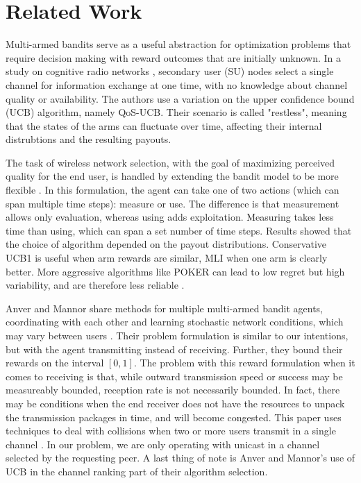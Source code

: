 \documentclass{article}
\begin{document}
\section{Related Work}

Multi-armed bandits serve as a useful abstraction for optimization problems that require decision making with reward outcomes that are initially unknown. In a study 
on cognitive radio networks \cite{qos_selection_mab}, secondary user (SU) nodes select a single channel for information exchange at one time, with no knowledge about 
channel quality or availability. The authors use a variation on the upper confidence bound (UCB) algorithm, namely QoS-UCB. Their scenario is called "restless", 
meaning that the states of the arms can fluctuate over time, affecting their internal distrubtions and the resulting payouts.

The task of wireless network selection, with the goal of maximizing perceived quality for the end user, is handled by extending the bandit model to be more flexible 
\cite{muMAB_wireless}. In this formulation, the agent can take one of two actions (which can span multiple time steps): measure or use. The difference is that 
measurement allows only evaluation, whereas using adds exploitation. Measuring takes less time than using, which can span a set number of time steps. Results showed 
that the choice of algorithm depended on the payout distributions. Conservative UCB1 is useful when arm rewards are similar, MLI when one arm is clearly better. 
More aggressive algorithms like POKER can lead to low regret but high variability, and are therefore less reliable \cite{muMAB_wireless}.

Anver and Mannor share methods for multiple multi-armed bandit agents, coordinating with each other and learning stochastic network conditions, which may vary between 
users \cite{multiuser_mab}. Their problem formulation is similar to our intentions, but with the agent transmitting instead of receiving. Further, they bound their rewards 
on the interval $[0,1]$. The problem with this reward formulation when it comes to receiving is that, while outward transmission speed or success may be measureably bounded, 
reception rate is not necessarily bounded. In fact, there may be conditions when the end receiver does not have the resources to unpack the transmission packages in time, 
and will become congested. This paper uses techniques to deal with collisions when two or more users transmit in a single channel \cite{multiuser_mab}. In our problem, we 
are only operating with unicast in a channel selected by the requesting peer. A last thing of note is Anver and Mannor's use of UCB in the channel ranking part of their 
algorithm selection.
\end{document}
